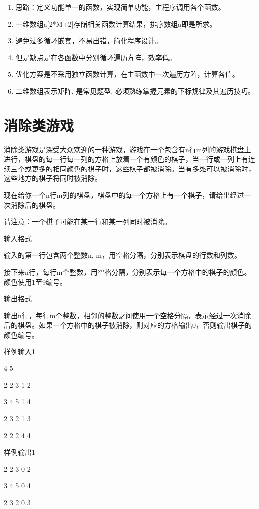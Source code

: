\begin{note}[要点]
\begin{enumerate}
\item 思路：定义功能单一的函数，实现简单功能，主程序调用各个函数。
\item 一维数组a[2*M+2]存储相关函数计算结果，排序数组a即是所求。 
\item 避免过多循环嵌套，不易出错，简化程序设计。 
\item 但是缺点是在各函数中分别循环遍历方阵，效率低。
\item 优化方案是不采用独立函数计算，在主函数中一次遍历方阵，计算各值。 
\item 二维数组表示矩阵, 是常见题型, 必须熟练掌握元素的下标规律及其遍历技巧。
\end{enumerate}
\end{note}

\section{消除类游戏}
消除类游戏是深受大众欢迎的一种游戏，游戏在一个包含有n行m列的游戏棋盘上进行，棋盘的每一行每一列的方格上放着一个有颜色的棋子，当一行或一列上有连续三个或更多的相同颜色的棋子时，这些棋子都被消除。当有多处可以被消除时，这些地方的棋子将同时被消除。

现在给你一个n行m列的棋盘，棋盘中的每一个方格上有一个棋子，请给出经过一次消除后的棋盘。

请注意：一个棋子可能在某一行和某一列同时被消除。

输入格式

输入的第一行包含两个整数n, m，用空格分隔，分别表示棋盘的行数和列数。

接下来n行，每行m个整数，用空格分隔，分别表示每一个方格中的棋子的颜色。颜色使用1至9编号。

输出格式

输出n行，每行m个整数，相邻的整数之间使用一个空格分隔，表示经过一次消除后的棋盘。如果一个方格中的棋子被消除，则对应的方格输出0，否则输出棋子的颜色编号。

样例输入1

4 5

2 2 3 1 2

3 4 5 1 4

2 3 2 1 3

2 2 2 4 4

样例输出1

2 2 3 0 2

3 4 5 0 4

2 3 2 0 3

